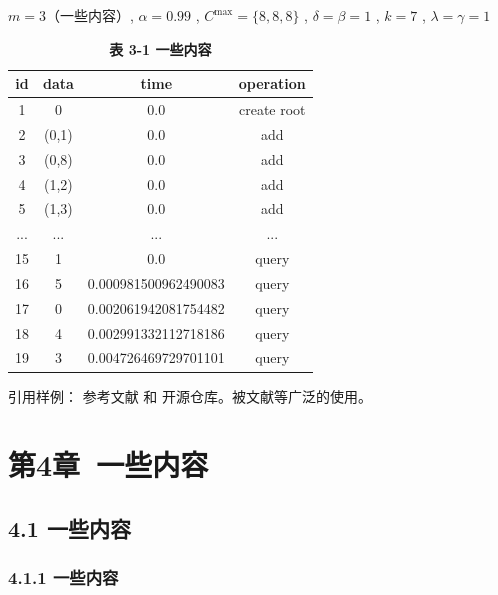 \documentclass[10pt,a4paper]{report}
\begin{document}
$m = 3$（一些内容）, $\alpha = 0.99$ , $C^{{\mathrm{max}}} = \{8,8,8\}$ , $\delta = \beta = 1$ , $k = 7$ , $\lambda = \gamma = 1$
\begin{table}[h]
    \centering
    \captionsetup{labelformat=empty, position=bottom}
    \caption{\songti\bfseries{} 表 3-1 一些内容}
    \begin{tabular}{cccc}
        \toprule
        id & data & time & operation \\
        \midrule
        1 & 0 & 0.0 & create root \\
        2 & (0,1) & 0.0 & add \\
        3 & (0,8) & 0.0 & add \\
        4 & (1,2) & 0.0 & add \\
        5 & (1,3) & 0.0 & add \\
        ... & ... & ... & ... \\
        15 & 1 & 0.0 & query \\
        16 & 5 & 0.000981500962490083 & query \\
        17 & 0 & 0.002061942081754482 & query \\
        18 & 4 & 0.002991332112718186 & query \\
        19 & 3 & 0.004726469729701101 & query \\
        \bottomrule
    \end{tabular}
\end{table}

引用样例：
参考文献\cite{li2012finite} 和 开源仓库\cite{aburn2019fodeint}。被文献\cite{LIU2024106124}等广泛的使用。

\chapter{第4章\ 
一些内容}\label{ux7b2c3ux7ae0-gorest-ux4e00ux79cdux57faux4e8eux56feux7684ux7075ux6d3bux7684ux5927ux6570ux636eux8ba1ux7b97ux6846ux67b6ux6a21ux578b}

\section{4.1 一些内容}\label{31-ux56feux4e0eux8ba1ux7b97}

\subsection{4.1.1
一些内容}\label{343-gorestux4efbux52a1ux6d41ux7a0b}
\end{document}
